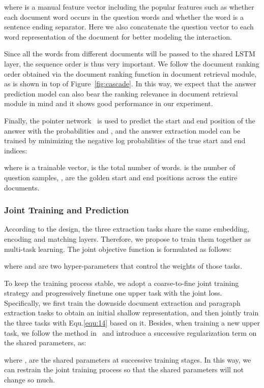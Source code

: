 \documentclass[letterpaper]{article} \usepackage{aaai19}  \usepackage{graphicx}
\begin{document}
where  is a manual feature vector including the popular features such as whether each document word occurs in the question words and whether the word is a sentence ending separator. Here we also concatenate the question vector   to each word representation  of the document for better modeling the interaction. 

Since all the words from different documents will be passed to the shared LSTM layer, the sequence order is thus very important. We follow the document ranking order obtained via the document ranking function in document retrieval module, as is shown in top of Figure~\ref{fig:cascade}. In this way, we expect that the answer prediction model can also bear the ranking relevance in document retrieval module in mind and it shows good performance in our experiment. 

Finally, the pointer network~\cite{wang2016machine} is used to predict the start and end position of the answer with the probabilities  and ,
and the answer extraction model can be trained by minimizing the negative log probabilities of the true start and end indices:


where  is a trainable vector,  is the total number of words.  is the number of question samples, ,  are the golden start and end positions across the entire documents. 

\subsubsection{Joint Training and Prediction}
According to the design, the three extraction tasks share the same embedding, encoding and matching layers. Therefore, we propose to train them together as multi-task learning. The joint objective function is formulated as follows:

where  and  are two hyper-parameters that control the weights of those tasks.

To keep the training process stable, we adopt a coarse-to-fine joint training strategy and progressively finetune one upper task with the joint loss. Specifically, we first train the downside document extraction and paragraph extraction tasks to obtain an initial shallow representation, and then jointly train the three tasks with Equ.\ref{equ:14} based on it. Besides, when training a new upper task, we follow the method in~\cite{hashimoto2016joint} and introduce a successive regularization term on the shared parameters, as:

where ,  are the shared parameters at successive training stages. In this way, we can restrain the joint training process so that the shared parameters will not change so much. 
\end{document}
